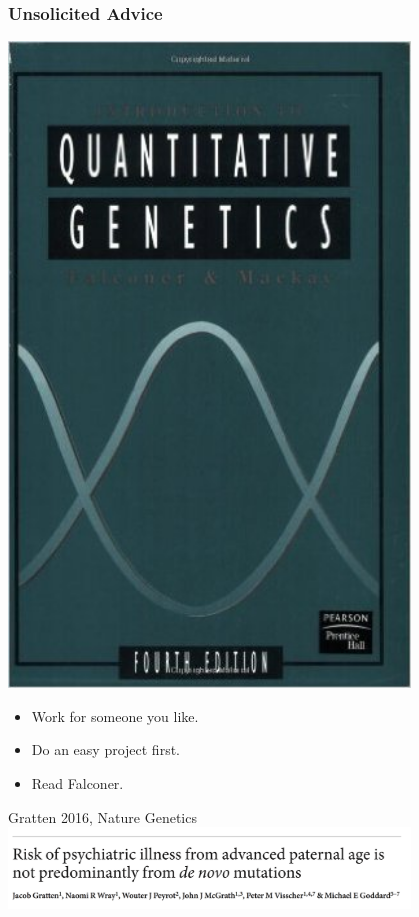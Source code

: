 \documentclass{beamer}
\begin{document}
\begin{frame}\frametitle{Unsolicited Advice}

    \begin{minipage}{0.45\textwidth}
        \begin{center}
            \includegraphics[width = 0.8\textwidth]{falconer}
        \end{center}
    \end{minipage}\hfill
    \begin{minipage}{0.5\textwidth}
        \begin{itemize}
            \item Work for someone you like.
            \item Do an easy project first.
            \item Read Falconer.
        \end{itemize}
        \vspace{1em}
        Gratten 2016, Nature Genetics\\
        \includegraphics[width = 0.8\textwidth]{wray}
    \end{minipage}
    
\end{frame}
\end{document}
